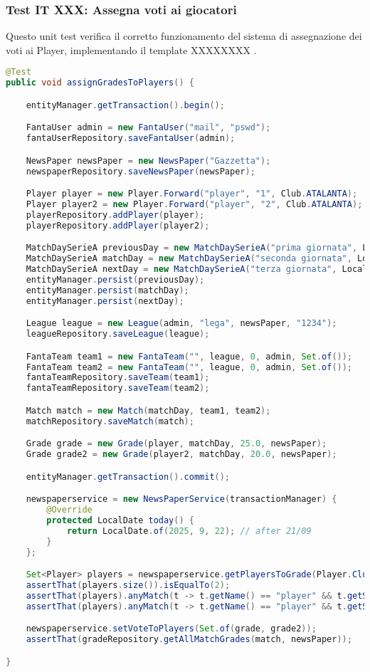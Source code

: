 \subsubsection{Test IT XXX: Assegna voti ai giocatori}

Questo unit test verifica il corretto funzionamento del sistema di assegnazione dei voti ai Player,
implementando il template XXXXXXXX .

\begin{lstlisting}[language=Java]
@Test
public void assignGradesToPlayers() {

	entityManager.getTransaction().begin();

    FantaUser admin = new FantaUser("mail", "pswd");
	fantaUserRepository.saveFantaUser(admin);

	NewsPaper newsPaper = new NewsPaper("Gazzetta");
	newspaperRepository.saveNewsPaper(newsPaper);

	Player player = new Player.Forward("player", "1", Club.ATALANTA);
	Player player2 = new Player.Forward("player", "2", Club.ATALANTA);
	playerRepository.addPlayer(player);
	playerRepository.addPlayer(player2);

	MatchDaySerieA previousDay = new MatchDaySerieA("prima giornata", LocalDate.of(2020, 1, 13));
	MatchDaySerieA matchDay = new MatchDaySerieA("seconda giornata", LocalDate.of(2025, 9, 20));
	MatchDaySerieA nextDay = new MatchDaySerieA("terza giornata", LocalDate.of(2020, 1, 26));
	entityManager.persist(previousDay);
	entityManager.persist(matchDay);
	entityManager.persist(nextDay);

	League league = new League(admin, "lega", newsPaper, "1234");
	leagueRepository.saveLeague(league);

	FantaTeam team1 = new FantaTeam("", league, 0, admin, Set.of());
	FantaTeam team2 = new FantaTeam("", league, 0, admin, Set.of());
	fantaTeamRepository.saveTeam(team1);
	fantaTeamRepository.saveTeam(team2);

	Match match = new Match(matchDay, team1, team2);
	matchRepository.saveMatch(match);

	Grade grade = new Grade(player, matchDay, 25.0, newsPaper);
	Grade grade2 = new Grade(player2, matchDay, 20.0, newsPaper);

	entityManager.getTransaction().commit();

    newspaperservice = new NewsPaperService(transactionManager) {
		@Override
		protected LocalDate today() {
			return LocalDate.of(2025, 9, 22); // after 21/09
		}
	};

	Set<Player> players = newspaperservice.getPlayersToGrade(Player.Club.ATALANTA);
	assertThat(players.size()).isEqualTo(2);
	assertThat(players).anyMatch(t -> t.getName() == "player" && t.getSurname() == "1");
	assertThat(players).anyMatch(t -> t.getName() == "player" && t.getSurname() == "2");

	newspaperservice.setVoteToPlayers(Set.of(grade, grade2));
	assertThat(gradeRepository.getAllMatchGrades(match, newsPaper));

}
\end{lstlisting}

